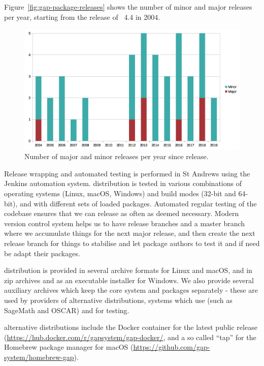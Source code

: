 \documentclass{deliverablereport}
\begin{document}
Figure~\ref{fig:gap-package-releases} shows the number of minor
and major \GAP releases per year, starting from the release of
\GAP~4.4 in 2004.

\begin{figure}[!ht]
    \centering
    \includegraphics[width=\textwidth]{images/gap-releases}
    \caption{Number of major and minor \GAP releases per year since  release.}
    \label{fig:gap-releases}
\end{figure}

Release wrapping and automated testing is performed in St Andrews
using the Jenkins automation system. \GAP distribution is tested
in various combinations of operating systems (Linux, macOS, Windows)
and build modes (32-bit and 64-bit), and with different sets of
loaded packages. Automated regular testing of the codebase ensures
that we can release as often as deemed necessary. Modern version
control system helps us to have release branches and a master branch
where we accumulate things for the next major release, and then
create the next release branch for things to stabilise and let package
authors to test it and if need be adapt their packages.

\GAP distribution is provided in several archive formats for Linux and macOS,
and in zip archives and as an executable installer for Windows.
We also provide several auxiliary archives which keep the core system
and packages separately - these are used by providers of alternative
distributions, systems which use \GAP (such as SageMath and OSCAR)
and for testing.

\GAP alternative distributions include the Docker container for the 
latest public \GAP release (\url{https://hub.docker.com/r/gapsystem/gap-docker/},
and a so called ``tap'' for the Homebrew package manager for macOS
(\url{https://github.com/gap-system/homebrew-gap}). 
\end{document}
